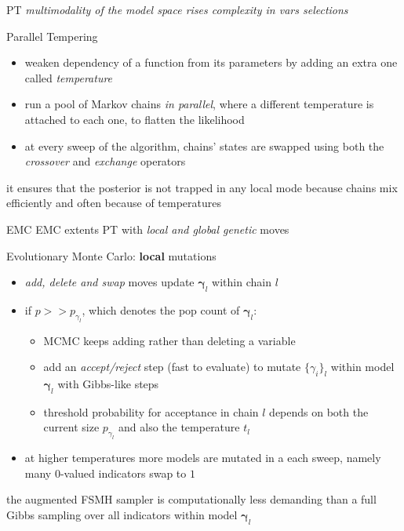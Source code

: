 \documentclass{beamer}
\newcommand{\vect}[1]{\boldsymbol{#1}}
\begin{document}
\begin{frame}{PT}
\emph{multimodality of the model space rises complexity in vars selections}
\begin{block}{Parallel Tempering}
    \begin{itemize}
        \item weaken dependency of a function from its parameters by adding an
        extra one called \emph{temperature}
        \item run a pool of Markov chains \emph{in parallel}, where a different
        temperature is attached to each one, to flatten the likelihood
        \item at every sweep of the algorithm, chains' states are swapped using
        both the \emph{crossover} and \emph{exchange} operators
    \end{itemize}
    it ensures that the posterior is not trapped in any local mode because 
    chains mix efficiently and often because of temperatures
\end{block}
\end{frame}

\begin{frame}{EMC}
EMC extents PT with \emph{local and global genetic} moves
\begin{block}{Evolutionary Monte Carlo: \textbf{local} mutations}
    \begin{itemize}
        \item \emph{add, delete and swap}  moves update
        $\vect{\gamma}_{l}$ within chain $l$
        \item if $p >> p_{\gamma_{l}}$, which denotes the pop count of $\vect{\gamma}_{l}$:
            \begin{itemize}
                \item MCMC keeps adding rather than deleting a variable
                \item add an \emph{accept/reject} step (fast to evaluate) to
                mutate $ \lbrace \gamma_{i} \rbrace_{l}$ within model
                $\vect{\gamma}_{l}$ with Gibbs-like steps
                \item threshold probability for acceptance in chain $l$ depends on both the 
                current size $p_{\gamma_{l}}$ and also the temperature $t_{l}$
            \end{itemize}
        \item at higher temperatures more models are mutated in a each sweep,
        namely many $0$-valued indicators swap to $1$
    \end{itemize}
    the augmented FSMH sampler is computationally less demanding than a full Gibbs sampling 
    over all indicators within model $\vect{\gamma}_{l}$
    \end{block}
\end{frame}
\end{document}
